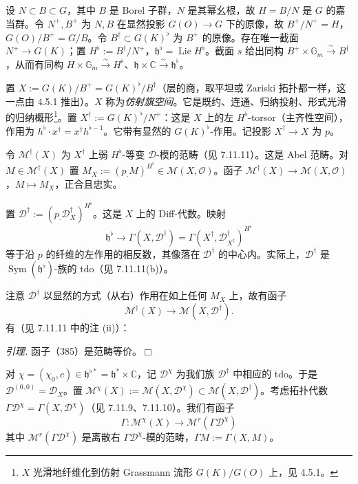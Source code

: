 设 $N\subset B\subset G$，其中 $B$ 是 Borel 子群，$N$ 是其幂幺根，故 $H=B/N$ 是 $G$ 的嘉当群。令 $N^{+},B^{+}$ 为 $N,B$ 在显然投影 $G(O)\to G$ 下的原像，故 $B^{+}/N^{+}=H$，$G(O)/B^{+}=G/B$。令 $B^{\dagger}\subset G(K)^{\flat}$ 为 $B^{+}$ 的原像。存在唯一截面 $N^{+}\to G(K)$；置 $H^{\flat}:=B^{\dagger}/N^{+}$，$\mathfrak{h}^{\flat}=\operatorname{Lie}H^{\flat}$。截面 $s$ 给出同构 $B^{+}\times\mathbb{G}_m\xrightarrow{\sim}B^{\dagger}$，从而有同构 $H\times\mathbb{G}_m\xrightarrow{\sim}H^{\flat}$、$\mathfrak{h}\times\mathbb{C}\xrightarrow{\sim}\mathfrak{h}^{\flat}$。

置 $X:=G(K)/B^{+}=G(K)^{\flat}/B^{\dagger}$（层的商，取平坦或 Zariski 拓扑都一样，这一点由 4.5.1 推出）。$X$ 称为\emph{仿射旗空间}。它是既约、连通、归纳投射、形式光滑的归纳概形\footnote{$X$ 光滑地纤维化到仿射 Grassmann 流形 $G(K)/G(O)$ 上，见 4.5.1。}。置 $X^{\dagger}:=G(K)^{\flat}/N^{+}$：这是 $X$ 上的左 $H^{\flat}$-torsor（主齐性空间），作用为 $h^{\flat}\cdot x^{\dagger}=x^{\dagger}h^{\flat-1}$。它带有显然的 $G(K)^{\flat}$-作用。记投影 $X^{\dagger}\to X$ 为 $p$。

 令 $\mathcal{M}^{\dagger}(X)$ 为 $X^{\dagger}$ 上弱 $H^{\flat}$-等变 $\mathcal{D}$-模的范畴（见 7.11.11）。这是 Abel 范畴。对 $M\in\mathcal{M}^{\dagger}(X)$ 置 $M_X:=(p_{\cdot}M)^{H^{\flat}}\in\mathcal{M}(X,\mathcal{O})$。函子 $\mathcal{M}^{\dagger}(X)\to\mathcal{M}(X,\mathcal{O})$，$M\mapsto M_X$，正合且忠实。

置 $\mathcal{D}^{\dagger}:=(p_{\cdot}\mathcal{D}^{\dagger}_X)^{H^{\flat}}$。这是 $X$ 上的 Diff-代数。映射
\begin{equation}\tag{384}
\mathfrak{h}^{\flat}\to\Gamma(X,\mathcal{D}^{\dagger})=\Gamma(X^{\dagger},\mathcal{D}^{\dagger}_{X^{\dagger}})^{H^{\flat}}
\end{equation}
等于沿 $p$ 的纤维的左作用的相反数，其像落在 $\mathcal{D}^{\dagger}$ 的中心内。实际上，$\mathcal{D}^{\dagger}$ 是 $\operatorname{Sym}(\mathfrak{h}^{\flat})$-族的 tdo（见 7.11.11(b)）。

注意 $\mathcal{D}^{\dagger}$ 以显然的方式（从右）作用在如上任何 $M_X$ 上，故有函子
\begin{equation}\tag{385}
\mathcal{M}^{\dagger}(X)\to\mathcal{M}(X,\mathcal{D}^{\dagger}).
\end{equation}
有（见 7.11.11 中的注 (ii)）：

 \emph{引理.} 函子（385）是范畴等价。\hfill$\Box$

 对 $\chi=(\chi_0,c)\in\mathfrak{h}^{\flat*}=\mathfrak{h}^{*}\times\mathbb{C}$，记 $\mathcal{D}^{\chi}$ 为我们族 $\mathcal{D}^{\dagger}$ 中相应的 tdo。于是 $\mathcal{D}^{(0,0)}=\mathcal{D}_X$。置 $\mathcal{M}^{\chi}(X):=\mathcal{M}(X,\mathcal{D}^{\chi})\subset\mathcal{M}(X,\mathcal{D}^{\dagger})$。考虑拓扑代数 $\Gamma\mathcal{D}^{\chi}=\Gamma(X,\mathcal{D}^{\chi})$（见 7.11.9、7.11.10）。我们有函子
\begin{equation}\tag{386}
\Gamma:\mathcal{M}^{\chi}(X)\to\mathcal{M}^{r}(\Gamma\mathcal{D}^{\chi})
\end{equation}
其中 $\mathcal{M}^{r}(\Gamma\mathcal{D}^{\chi})$ 是离散右 $\Gamma\mathcal{D}^{\chi}$-模的范畴，$\Gamma M:=\Gamma(X,M)$。

